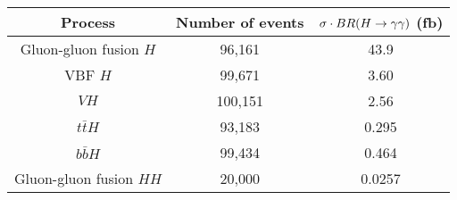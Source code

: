 \begin{tabular}{|c|c|c|}
\hline
Process & Number of events & $\sigma \cdot BR(H\to\gamma\gamma)$ (fb) \\
\hline
Gluon-gluon fusion $H$ & 96,161 & 43.9 \\
VBF $H$ & 99,671 & 3.60 \\
$VH$ & 100,151 & 2.56 \\
$t\bar{t}H$ & 93,183 & 0.295 \\
$b\bar{b}H$ & 99,434 & 0.464 \\
Gluon-gluon fusion $HH$ & 20,000 & 0.0257 \\
\hline
\end{tabular}

